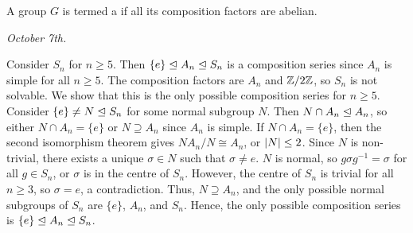 \begin{definition}
    A group $G$ is termed a  if all its composition factors are abelian.
\end{definition}

\textit{October 7th.}

\begin{example}
    Consider $S_{n}$ for $n \geq 5$. Then $\{e\} \trianglelefteq A_{n} \trianglelefteq S_{n}$ is a composition series since $A_{n}$ is simple for all $n \geq 5$. The composition factors are $A_{n}$ and $\mathbb{Z}/2\mathbb{Z}$, so $S_{n}$ is not solvable. We show that this is the only possible composition series for $n \geq 5$. Consider $\{e\} \neq N \trianglelefteq S_{n}$ for some normal subgroup $N$. Then $N \cap A_{n} \trianglelefteq A_{n}$, so either $N \cap A_{n} = \{e\}$ or $N \supseteq A_{n}$ since $A_{n}$ is simple. If $N \cap A_{n} = \{e\}$, then the second isomorphism theorem gives $NA_{n}/N \cong A_{n}$, or $\left| N \right| \leq 2$. Since $N$ is non-trivial, there exists a unique $\sigma \in N$ such that $\sigma \neq e$. $N$ is normal, so $g \sigma g^{-1} = \sigma$ for all $g \in S_{n}$, or $\sigma$ is in the centre of $S_{n}$. However, the centre of $S_{n}$ is trivial for all $n \geq 3$, so $\sigma = e$, a contradiction. Thus, $N \supseteq A_{n}$, and the only possible normal subgroups of $S_{n}$ are $\{e\}$, $A_{n}$, and $S_{n}$. Hence, the only possible composition series is $\{e\} \trianglelefteq A_{n} \trianglelefteq S_{n}$.
\end{example}

